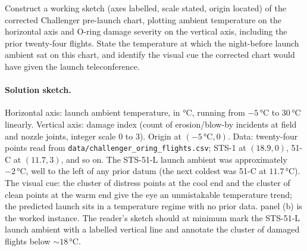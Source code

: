 \begin{exercise}
Construct a working sketch (axes labelled, scale stated, origin
located) of the corrected Challenger pre-launch chart, plotting
ambient temperature on the horizontal axis and O-ring damage
severity on the vertical axis, including the prior twenty-four
flights. State the temperature at which the night-before launch
ambient sat on this chart, and identify the visual cue the corrected
chart would have given the launch teleconference.

\paragraph{Solution sketch.}
Horizontal axis: launch ambient temperature, in $\si{\degreeCelsius}$,
running from $-5\,\si{\degreeCelsius}$ to $30\,\si{\degreeCelsius}$
linearly. Vertical axis: damage index (count of erosion/blow-by
incidents at field and nozzle joints, integer scale $0$ to $3$).
Origin at $(-5\,\si{\degreeCelsius}, 0)$. Data: twenty-four points
read from
\texttt{data/challenger\_oring\_flights.csv}; STS-1 at $(18.9, 0)$,
51-C at $(11.7, 3)$, and so on. The STS-51-L launch ambient was
approximately $-2\,\si{\degreeCelsius}$, well to the left of any
prior datum (the next coldest was 51-C at $11.7\,\si{\degreeCelsius}$).
The visual cue: the cluster of distress points at the cool end and
the cluster of clean points at the warm end give the eye an
unmistakable temperature trend; the predicted launch sits in a
temperature regime with no prior data.  panel (b) is the worked instance. The reader's
sketch should at minimum mark the STS-51-L launch ambient with a
labelled vertical line and annotate the cluster of damaged flights
below $\sim 18\,\si{\degreeCelsius}$.
\end{exercise}

